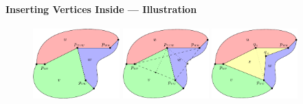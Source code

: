 \documentclass[t,18pt]{beamer}
\newcommand{\emdash}{---}
\begin{document}
\begin{frame}[c]
  \frametitle{}
  \framesubtitle{Inserting Vertices Inside \emdash{} Illustration}
  \begin{figure}
    \includegraphics[height=2.7cm]{../Thesis/Resources/InsertVertex-Illustration-1.pdf}\quad
    \includegraphics[height=2.7cm]{../Thesis/Resources/InsertVertex-Illustration-2.pdf}\quad
    \includegraphics[height=2.7cm]{../Thesis/Resources/InsertVertex-Illustration-3.pdf}
  \end{figure}
\end{frame}
\end{document}

